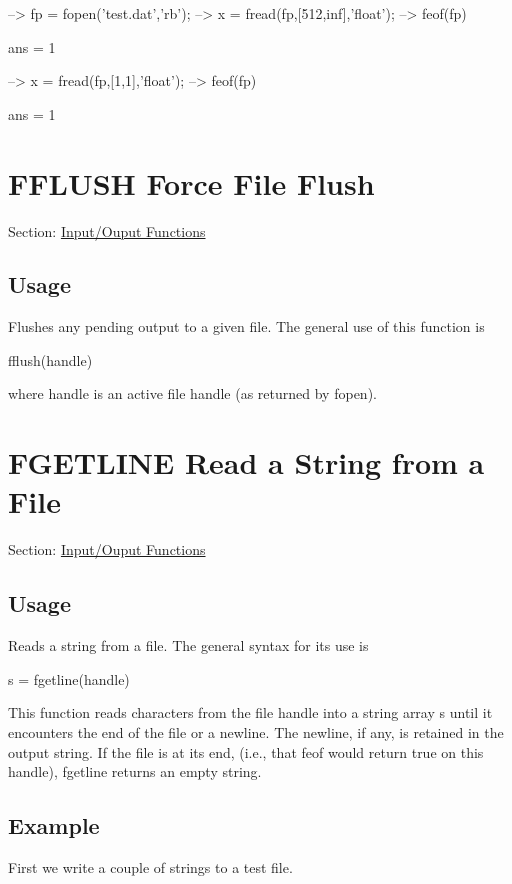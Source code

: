 \begin{DoxyVerbInclude}
--> fp = fopen('test.dat','rb');
--> x = fread(fp,[512,inf],'float');
--> feof(fp)

ans = 
 1 

--> x = fread(fp,[1,1],'float');
--> feof(fp)

ans = 
 1 
\end{DoxyVerbInclude}
 \hypertarget{io_fflush}{}\section{F\-F\-L\-U\-S\-H Force File Flush}\label{io_fflush}
Section\-: \hyperlink{sec_io}{Input/\-Ouput Functions} \hypertarget{vtkwidgets_vtkxyplotwidget_Usage}{}\subsection{Usage}\label{vtkwidgets_vtkxyplotwidget_Usage}
Flushes any pending output to a given file. The general use of this function is \begin{DoxyVerb}   fflush(handle)
\end{DoxyVerb}
 where {\ttfamily handle} is an active file handle (as returned by {\ttfamily fopen}). \hypertarget{io_fgetline}{}\section{F\-G\-E\-T\-L\-I\-N\-E Read a String from a File}\label{io_fgetline}
Section\-: \hyperlink{sec_io}{Input/\-Ouput Functions} \hypertarget{vtkwidgets_vtkxyplotwidget_Usage}{}\subsection{Usage}\label{vtkwidgets_vtkxyplotwidget_Usage}
Reads a string from a file. The general syntax for its use is \begin{DoxyVerb}  s = fgetline(handle)
\end{DoxyVerb}
 This function reads characters from the file {\ttfamily handle} into a {\ttfamily string} array {\ttfamily s} until it encounters the end of the file or a newline. The newline, if any, is retained in the output string. If the file is at its end, (i.\-e., that {\ttfamily feof} would return true on this handle), {\ttfamily fgetline} returns an empty string. \hypertarget{variables_struct_Example}{}\subsection{Example}\label{variables_struct_Example}
First we write a couple of strings to a test file.



